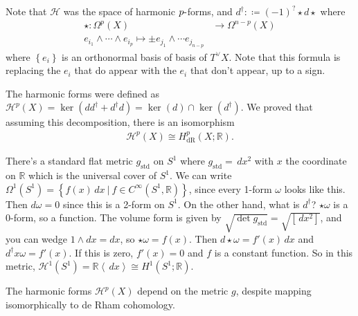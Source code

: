 \begin{remark}

Note that \(\mathcal{H}\) was the space of harmonic
\(p{\hbox{-}}\)forms, and \(d^\dagger: \coloneqq(-1)^? \star d\star\)
where
\begin{align*}
\star: \Omega^{p}(X) &\to \Omega^{n-p}(X) \\
e_{i_1} \wedge \cdots \wedge e_{i_p} \mapsto \pm e_{j_1} \wedge \cdots e_{j_{n-p}}
\end{align*}
where \(\left\{{ e_i}\right\}\) is an orthonormal basis of basis of
\(T^\vee X\). Note that this formula is replacing the \(e_i\) that do
appear with the \(e_i\) that don't appear, up to a sign.

The harmonic forms were defined as
\({\mathcal{H}}^p(X) = \ker (dd^\dagger + d^\dagger d ) = \ker (d) \cap\ker(d^\dagger)\).
We proved that assuming this decomposition, there is an isomorphism
\begin{align*}
{\mathcal{H}}^p(X) \cong H^p_{\mathrm{dR}}(X; {\mathbb{R}})
.\end{align*}

\end{remark}

\begin{example}

There's a standard flat metric \(g_\text{std}\) on \(S^1\) where
\(g_\text{std}= \,dx^2\) with \(x\) the coordinate on \({\mathbb{R}}\)
which is the universal cover of \(S^1\). We can write
\(\Omega^1(S^1) = \left\{{ f(x)\,dx{~\mathrel{\Big|}~}f \in C^{\infty }(S^1, {\mathbb{R}}) }\right\}\),
since every 1-form \(\omega\) looks like this. Then \(d \omega = 0\)
since this is a 2-form on \(S^1\). On the other hand, what is
\(d^\dagger\)? \(\star\omega\) is a 0-form, so a function. The volume
form is given by \(\sqrt{ \det g_\text{std}} = \sqrt{ [\,dx^2 ] }\), and
you can wedge \(1\wedge dx = dx\), so \(\star\omega = f(x)\). Then
\(d \star\omega = f'(x) \,dx\) and \(d^\dagger x \omega = f'(x)\). If
this is zero, \(f'(x) = 0\) and \(f\) is a constant function. So in this
metric,
\({\mathcal{H}}^1(S^1) = {\mathbb{R}}\left\langle{ \,dx}\right\rangle \cong H^1(S^1; {\mathbb{R}})\).

\end{example}

\begin{remark}[Important]

The harmonic forms \({\mathcal{H}}^p(X)\) depend on the metric \(g\),
despite mapping isomorphically to de Rham cohomology.

\end{remark}

